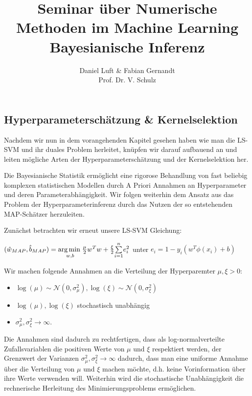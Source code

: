 \documentclass{report}
\theoremstyle{linebreak}
\begin{document}
\title{Seminar über Numerische Methoden im Machine Learning \\ Bayesianische Inferenz}

\author{Daniel Luft & Fabian Gernandt \\ Prof. Dr. V. Schulz}

{}

\subsection{Hyperparameterschätzung \& Kernelselektion}

Nachdem wir nun in dem vorangehenden Kapitel gesehen haben wie man die LS-SVM und ihr duales Problem herleitet, knüpfen wir darauf aufbauend an und leiten mögliche Arten der Hyperparameterschätzung und der Kernelselektion her. 

Die Bayesianische Statistik ermöglicht eine rigorose Behandlung von fast beliebig komplexen statistischen Modellen durch A Priori Annahmen an Hyperparameter und deren Parameterabhängigkeit. Wir folgen weiterhin dem Ansatz aus \cite{LS-SVM} das Problem der Hyperparameterinferenz durch das Nutzen der so entstehenden MAP-Schätzer herzuleiten.

Zunächst betrachten wir erneut unsere LS-SVM Gleichung:

\begin{center}
	$(\hat{w}_{MAP},\hat{b}_{MAP})  = \underset{w,b}{\arg \min \hspace{0.1cm}} 					 \frac{\mu}{2}w^Tw + \frac{\xi}{2}\underset{i=1}{\overset{n}{\sum}}e_i^2$
	unter $e_i = 1 - y_i(w^T \phi(x_i) +b)$
\end{center}

Wir machen folgende Annahmen an die Verteilung der Hyperparemter $\mu, \xi >0$:

\begin{itemize}
	\item $\log(\mu) \sim \mathcal{N}(0, \sigma_\mu^2), \log(\xi) \sim \mathcal{N}(0, 				  \sigma_\xi^2)$ 
	\item $\log(\mu), \log(\xi)$ stochastisch unabhängig
	\item $\sigma_\mu^2, \sigma_\xi^2 \rightarrow \infty$.
\end{itemize}

Die Annahmen sind dadurch zu rechtfertigen, dass als log-normalverteilte Zufallsvariablen die positiven Werte von $\mu$ und $\xi$ respektiert werden, der Grenzwert der Varianzen $\sigma_\mu^2, \sigma_\xi^2 \rightarrow \infty$ dadurch, dass man eine uniforme Annahme über die Verteilung von $\mu$ und $\xi$ machen möchte, d.h. keine Vorinformation über ihre Werte verwenden will. Weiterhin wird die stochastische Unabhängigkeit die rechnerische Herleitung des Minimierungsproblems ermöglichen.
\end{document}
